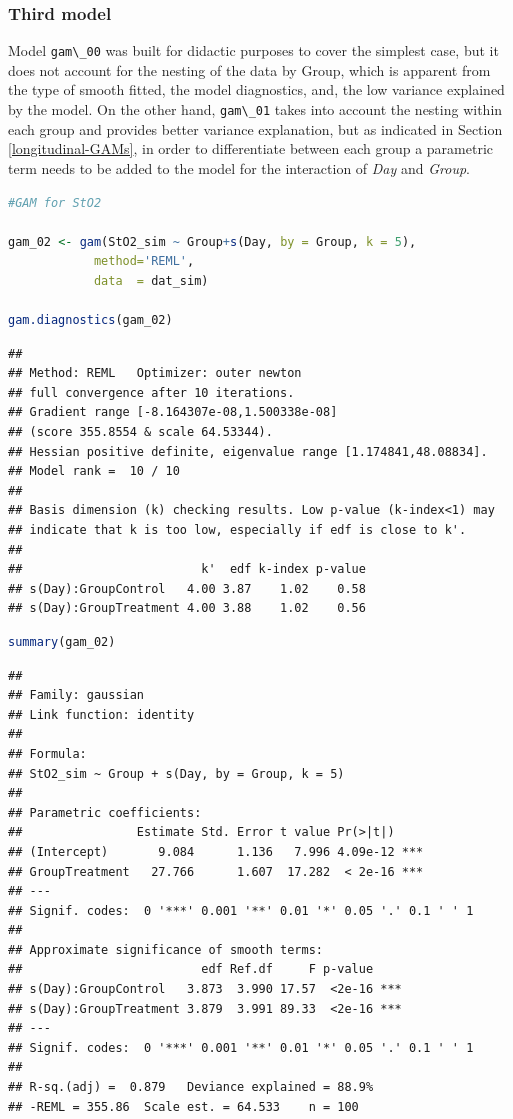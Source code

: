 \documentclass[
]{article}
\newcommand{\passthrough}[1]{#1}
\begin{document}
\hypertarget{third-model}{%
\subsubsection{Third model}\label{third-model}}

Model \passthrough{\lstinline!gam\_00!} was built for didactic purposes to cover the simplest case, but it does not account for the nesting of the data by Group, which is apparent from the type of smooth fitted, the model diagnostics, and, the low variance explained by the model. On the other hand, \passthrough{\lstinline!gam\_01!} takes into account the nesting within each group and provides better variance explanation, but as indicated in Section \ref{longitudinal-GAMs}, in order to differentiate between each group a parametric term needs to be added to the model for the interaction of \emph{Day} and \emph{Group}.

\begin{lstlisting}[language=R]
#GAM for StO2

gam_02 <- gam(StO2_sim ~ Group+s(Day, by = Group, k = 5),
            method='REML',
            data  = dat_sim)

gam.diagnostics(gam_02)
\end{lstlisting}

\begin{lstlisting}
## 
## Method: REML   Optimizer: outer newton
## full convergence after 10 iterations.
## Gradient range [-8.164307e-08,1.500338e-08]
## (score 355.8554 & scale 64.53344).
## Hessian positive definite, eigenvalue range [1.174841,48.08834].
## Model rank =  10 / 10 
## 
## Basis dimension (k) checking results. Low p-value (k-index<1) may
## indicate that k is too low, especially if edf is close to k'.
## 
##                         k'  edf k-index p-value
## s(Day):GroupControl   4.00 3.87    1.02    0.58
## s(Day):GroupTreatment 4.00 3.88    1.02    0.56
\end{lstlisting}

\begin{lstlisting}[language=R]
summary(gam_02)
\end{lstlisting}

\begin{lstlisting}
## 
## Family: gaussian 
## Link function: identity 
## 
## Formula:
## StO2_sim ~ Group + s(Day, by = Group, k = 5)
## 
## Parametric coefficients:
##                Estimate Std. Error t value Pr(>|t|)    
## (Intercept)       9.084      1.136   7.996 4.09e-12 ***
## GroupTreatment   27.766      1.607  17.282  < 2e-16 ***
## ---
## Signif. codes:  0 '***' 0.001 '**' 0.01 '*' 0.05 '.' 0.1 ' ' 1
## 
## Approximate significance of smooth terms:
##                         edf Ref.df     F p-value    
## s(Day):GroupControl   3.873  3.990 17.57  <2e-16 ***
## s(Day):GroupTreatment 3.879  3.991 89.33  <2e-16 ***
## ---
## Signif. codes:  0 '***' 0.001 '**' 0.01 '*' 0.05 '.' 0.1 ' ' 1
## 
## R-sq.(adj) =  0.879   Deviance explained = 88.9%
## -REML = 355.86  Scale est. = 64.533    n = 100
\end{lstlisting}
\end{document}
